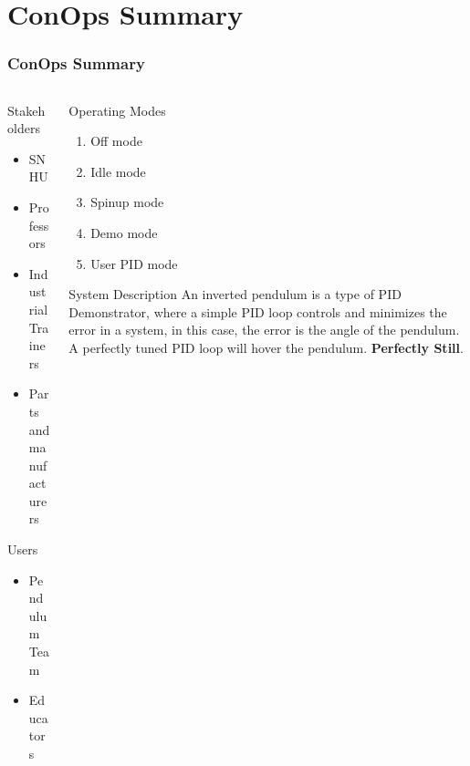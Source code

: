 \documentclass[aspectratio=169]{beamer}
\begin{document}
\section{ConOps Summary}
\begin{frame}
    \frametitle{ConOps Summary}

    \begin{columns}

    \begin{column}{0.34\textwidth}
        Stakeholders
        \begin{itemize}
         \item SNHU
         \item Professors
         \item Industrial Trainers
         \item Parts and manufacturers
        \end{itemize}

        Users
        \begin{itemize}
         \item Pendulum Team
         \item Educators
        \end{itemize}
    \end{column}

    \begin{column}{0.65\textwidth}
        \begin{block}{Operating Modes}
            \begin{enumerate}
            \item Off mode
            \item Idle mode
            \item Spinup mode
            \item Demo mode
            \item User PID mode
            \end{enumerate}
        \end{block}

        \begin{block}{System Description}
            \small{An inverted pendulum is a type of PID Demonstrator, where a simple PID loop
            controls and minimizes the error in a system, in this case, the error is the angle of the pendulum. A perfectly tuned PID loop will hover the pendulum.}
            \textbf{Perfectly Still}.
        \end{block}
    \end{column}
\end{columns}


\end{frame}
\end{document}
